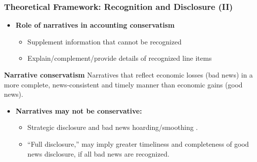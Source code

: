 \documentclass{beamer}
\begin{document}
\begin{frame}
\frametitle{Theoretical Framework: Recognition and Disclosure (II)}
\begin{itemize}
\normalsize
	\item \textbf{Role of narratives in accounting conservatism} 
		\begin{itemize}	
		\item Supplement information that cannot be recognized
		\item Explain/complement/provide details of recognized line items
	\end{itemize}
\pause
\end{itemize}
\begin{block}{\footnotesize 
		\textbf{Narrative conservatism}}
	Narratives that reflect economic losses (bad news) in a more complete, news-consistent and timely manner than economic gains (good news).
\end{block}

\pause
\begin{itemize}
	\item \textbf{Narratives may not be conservative:} 
	\begin{itemize}
			\item Strategic disclosure and bad news hoarding/smoothing \citep[e.g.,][]{kothariManagersWithholdBad2009,segalAreManagersStrategic2016,chapmanInformationOverloadDisclosure2019}.
		\item ``Full disclosure,'' \citep{guayConservativeDisclosure2018} may imply greater timeliness and completeness of good news disclosure, if all bad news are recognized.
	\end{itemize}

\end{itemize}



	

\end{frame}
\end{document}
